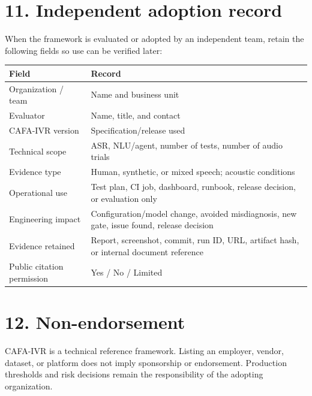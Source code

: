 \documentclass[10pt]{article}
\begin{document}
\section*{11. Independent adoption record}
When the framework is evaluated or adopted by an independent team, retain the following fields so use can be verified later:
\begin{center}\small
\begin{tabular}{lp{4.9in}}
\toprule
Field & Record\\
\midrule
Organization / team & Name and business unit\\
Evaluator & Name, title, and contact\\
CAFA-IVR version & Specification/release used\\
Technical scope & ASR, NLU/agent, number of tests, number of audio trials\\
Evidence type & Human, synthetic, or mixed speech; acoustic conditions\\
Operational use & Test plan, CI job, dashboard, runbook, release decision, or evaluation only\\
Engineering impact & Configuration/model change, avoided misdiagnosis, new gate, issue found, release decision\\
Evidence retained & Report, screenshot, commit, run ID, URL, artifact hash, or internal document reference\\
Public citation permission & Yes / No / Limited\\
\bottomrule
\end{tabular}
\end{center}

\section*{12. Non-endorsement}
CAFA-IVR is a technical reference framework. Listing an employer, vendor, dataset, or platform does not imply sponsorship or endorsement. Production thresholds and risk decisions remain the responsibility of the adopting organization.
\end{document}
